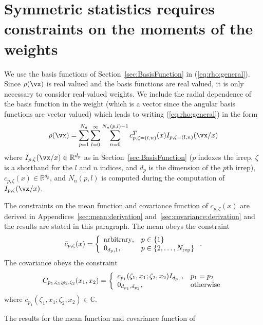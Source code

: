 \section{Symmetric statistics requires constraints on the moments of the weights}
\label{sec:constraintsonthemomentsoftheweights}
We use the basis functions of Section~\ref{sec:BasisFunction} in
(\ref{eq:rho:general}).
Since $\rho(\vx)$ is real valued and the basis functions are real valued,
it is only necessary to consider real-valued weights.
We include the radial dependence of the basis function in the weight (which
is a vector since the angular basis functions are vector valued) which
leads to writing (\ref{eq:rho:general}) in the form
\begin{equation}
\rho(\vx)
=
\sum_{p=1}^{\Ngroup}
\sum_{l=0}^\infty
\sum_{n=0}^{N_n(p,l)-1}
c_{p,\zeta=(l,n)}^T(x)
I_{p,\zeta=(l,n)}(\vx/x)
\label{eq:I2rho}
\end{equation}
where
$I_{p,\zeta}(\vx/x)\in\mathbb{R}^{d_p}$ as in Section~\ref{sec:BasisFunction}
($p$ indexes the irrep, $\zeta$ is a shorthand for the $l$ and $n$ indices,
and $d_p$ is the dimension of the $p$th irrep),
$c_{p,\zeta}(x)\in\mathbb{R}^{d_p}$,
and
$N_n(p,l)$ is computed during the computation of $I_{p,\zeta}(\vx/x)$.
\par
The constraints on the mean function and covariance function of
$c_{p,\zeta}(x)$ are derived in Appendices~\ref{sec:mean:derivation}
and~\ref{sec:covariance:derivation} and the results are stated in this
paragraph.
The mean obeys the constraint
\begin{equation}
\bar c_{p,\zeta}(x)
=
\left\{
\begin{array}{ll}
\mbox{arbitrary}
,
&
p\in\{1\}
\\
0_{d_p,1}
,
&
p\in\{2,\dots,N_{\rm rep}\}
\end{array}
\right.
\label{eq:barc:constraint:xdependent}
.
\end{equation}
The covariance obeys the constraint
\begin{equation}
C_{p_1,\zeta_1;p_2,\zeta_2}(x_1,x_2)
=
\left\{
\begin{array}{ll}
c_{p_1}(\zeta_1,x_1;\zeta_2,x_2)
I_{d_{p_1}}
,
&
p_1=p_2
\\
0_{d_{p_1},d_{p_2}}
,
&
\mbox{otherwise}
\end{array}
\right.
\label{eq:Cc:constraint:xdependent}
\end{equation}
where $c_{p_1}(\zeta_1,x_1;\zeta_2,x_2)\in\mathbb{C}$.
\par
The results for the mean function and covariance function of
